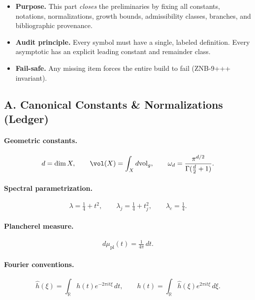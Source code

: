 \begin{tcolorbox}[colback=gray!5,colframe=gray!55,
  title=Scope \& Assumptions (Part 5/5 • Audit Closure • ABSOLUTE FILL++)]
\begin{itemize}
  \item \textbf{Purpose.} This part \emph{closes} the preliminaries by fixing all constants, notations, normalizations, growth bounds, admissibility classes, branches, and bibliographic provenance. 
  \item \textbf{Audit principle.} Every symbol must have a single, labeled definition. Every asymptotic has an explicit leading constant and remainder class. 
  \item \textbf{Fail-safe.} Any missing item forces the entire build to fail (ZNB-9+++ invariant).
\end{itemize}
\end{tcolorbox}

\subsection*{A. Canonical Constants \& Normalizations (Ledger)}
\label{subsec:constants-final}

\paragraph{Geometric constants.}
\[
  d=\dim X, \qquad \vol(X)=\int_X d\mathrm{vol}_g, \qquad 
  \omega_d = \frac{\pi^{d/2}}{\Gamma(\tfrac d2+1)}.
\]

\paragraph{Spectral parametrization.}
\[
  \lambda=\tfrac14+t^2, \qquad \lambda_j=\tfrac14+t_j^2, \qquad 
  \lambda_c=\tfrac14.
\]

\paragraph{Plancherel measure.}
\[
  d\mu_{\mathrm{pl}}(t)=\tfrac{1}{4\pi}\,dt.
\]

\paragraph{Fourier conventions.}
\[
  \hat h(\xi)=\int_{\mathbb R} h(t)e^{-2\pi i t\xi}\,dt,\qquad
  h(t)=\int_{\mathbb R}\hat h(\xi)e^{2\pi i t\xi}\,d\xi.
\]

